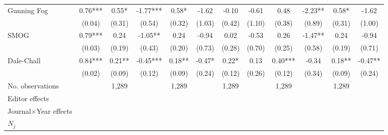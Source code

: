\begin{sidewaystable}
\begin{threeparttable}
\begin{tabular}{p{3cm}S@{}S@{}S@{}S@{}S@{}S@{}S@{}S@{}S@{}S@{}S@{}}
            Gunning Fog                   &        0.76***&        0.55*  &       -1.77***&        0.58*  &       -1.62   &       -0.10   &       -0.61   &        0.48   &       -2.23** &        0.58*  &       -1.62   \\
                                          &      (0.04)   &      (0.31)   &      (0.54)   &      (0.32)   &      (1.03)   &      (0.42)   &      (1.10)   &      (0.38)   &      (0.89)   &      (0.31)   &      (1.00)   \\
            SMOG                          &        0.79***&        0.24   &       -1.05** &        0.24   &       -0.94   &        0.02   &       -0.53   &        0.26   &       -1.47** &        0.24   &       -0.94   \\
                                          &      (0.03)   &      (0.19)   &      (0.43)   &      (0.20)   &      (0.73)   &      (0.28)   &      (0.70)   &      (0.25)   &      (0.58)   &      (0.19)   &      (0.71)   \\
            Dale-Chall                    &        0.84***&        0.21** &       -0.45***&        0.18** &       -0.47*  &        0.22*  &        0.13   &        0.40***&       -0.34   &        0.18** &       -0.47** \\
                                          &      (0.02)   &      (0.09)   &      (0.12)   &      (0.09)   &      (0.24)   &      (0.12)   &      (0.26)   &      (0.12)   &      (0.34)   &      (0.09)   &      (0.24)   \\
            \midrule
            No. observations              &               &       1,289   &               &       1,289   &               &       1,289   &               &       1,289   &               &       1,289   &               \\
            \midrule
            Editor effects       &               &           {}   &               &           {}   &               &           {}   &               &           {}   &               &               &               \\
            Journal\(\times\)Year effects          &               &           {}   &               &           {}   &               &           {}   &               &           {}   &               &               &               \\
            \(N_j\)                       &               &           {}   &               &           {}   &               &           {}   &               &           {}   &               &               &               \\

\end{tabular}
\end{threeparttable}
\end{sidewaystable}
